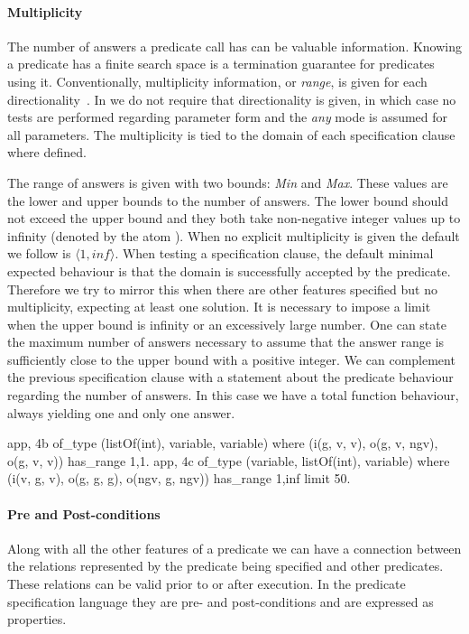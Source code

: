 \paragraph{\bf Multiplicity}
The number of answers a predicate call has can be valuable
information.
%
Knowing a predicate has a finite search space is a termination
guarantee for predicates using it.
%
Conventionally, multiplicity information, or \emph{range}, is given for
each directionality~\cite{somogyi1995mercury}.
%
In \plqc{} we do not require that directionality is given, in which
case no tests are performed regarding parameter form and the \emph{any}
mode is assumed for all parameters.
%
The multiplicity is tied to the domain of each specification clause
where defined.


The range of answers is given with two bounds: \emph{Min} and
\emph{Max}.
%
These values are the lower and upper bounds to the number of answers.
%
The lower bound should not exceed the upper bound and they both take
non-negative integer values up to infinity (denoted by the atom
).
%
When no explicit multiplicity is given the default we 
follow is
$\langle 1, inf \rangle $.
%
When testing a specification clause, the default minimal expected
behaviour is that the domain is successfully accepted by the predicate.
%
Therefore we try to mirror this when there are other features
specified but no multiplicity, expecting at least one solution.
%
It is necessary to impose a limit when the upper bound is infinity or an
excessively large number.
%
One can state the maximum number of answers necessary to assume that the
answer range is sufficiently close to the upper bound with a positive
integer.
%
We can complement the previous specification clause with a statement
about the predicate behaviour regarding the number of answers.
%
In this case we have a total function behaviour, always yielding one and
only one answer.
%
\begin{yapcode}
 {app, 4b} of_type (listOf(int), variable, variable)
    where (i(g, v, v), o(g, v, ngv), o(g, v, v))
    has_range {1,1}.
 {app, 4c} of_type (variable, listOf(int), variable)
    where (i(v, g, v), o(g, g, g), o(ngv, g, ngv))
    has_range {1,inf} limit 50.
\end{yapcode}


\paragraph{\bf Pre and Post-conditions}

Along with all the other features of a predicate we can have a
connection between the relations represented by the predicate being
specified and other predicates.
%
These relations can be valid prior to or after execution.
%
In the predicate specification language they are pre- and
post-conditions and are expressed as \plqc{} properties.


